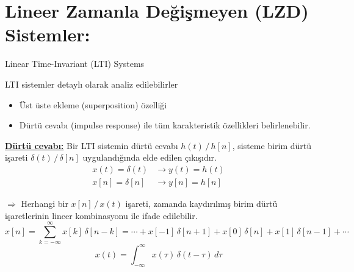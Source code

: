 \documentclass[11pt,a4paper]{article}
\begin{document}
\renewcommand{\thempfootnote}{\alph{mpfootnote}} %

\section{Lineer Zamanla Değişmeyen (LZD) Sistemler:}
Linear Time-Invariant (LTI) Systems

LTI sistemler detaylı olarak analiz edilebilirler
\begin{itemize}[label=--]
  \item Üst üste ekleme (superposition) özelliği
  \item Dürtü cevabı (impulse response) ile tüm karakteristik özellikleri belirlenebilir.
\end{itemize}

\textbf{\underline{Dürtü cevabı:}} Bir LTI sistemin dürtü cevabı $h(t)\,/\,h[n]$, sisteme birim dürtü işareti $\delta(t)\,/\,\delta[n]$ uygulandığında elde edilen çıkışıdır.
\begin{align*}
  x(t) = \delta(t) &\longrightarrow y(t) = h(t) \\
  x[n] = \delta[n] &\longrightarrow y[n] = h[n]
\end{align*}

$\Rightarrow$ Herhangi bir $x[n]\,/\,x(t)$ işareti, zamanda kaydırılmış birim dürtü işaretlerinin lineer kombinasyonu ile ifade edilebilir.
\[ x[n] = \sum_{k=-\infty}^{\infty} x[k]\,\delta[n-k] = \cdots + x[-1]\,\delta[n+1] + x[0]\,\delta[n] + x[1]\,\delta[n-1] + \cdots \]
\[ x(t) = \int_{-\infty}^{\infty} x(\tau)\,\delta(t-\tau)\,d\tau \]
\end{document}
